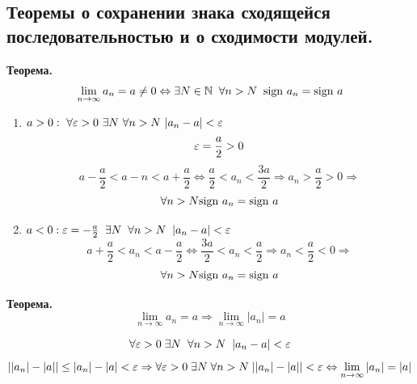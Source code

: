 \subsection{Теоремы о сохранении знака сходящейся последовательностью и о сходимости модулей.}

\begin{tcolorbox}
	\textbf{Теорема.}
	\[ \lim_{n\to\infty} a_n = a \not=0 \Leftrightarrow \exists N \in \mathbb{N}\;\; \forall n > N\;\; \text{sign\ } a_n = \text{sign\ } a \]
\end{tcolorbox}
\begin{tcolorbox}[title=Доказательство]
	\begin{enumerate}
		\item $a > 0:\ \forall \eps > 0\ \exists N\ \forall n > N\ |a_n - a|<\eps$
		\[ \varepsilon = \frac{a}{2} > 0 \]
		\[ a - \frac{a}{2} < a-n < a + \frac{a}{2} \Leftrightarrow \frac{a}{2} < a_n < \frac{3a}{2} \Rightarrow a_n > \frac{a}{2} > 0 \Rightarrow \]
		\[ \forall n > N \text{sign\ } a_n = \text{sign\ } a \]
	\item $a < 0: \varepsilon = -\frac{a}{2}\;\; \exists N \;\; \forall n > N\;\; |a_n - a| < \varepsilon$
		\[ a + \frac{a}{2} < a_n < a - \frac{a}{2} \Leftrightarrow \frac{3a}{2} < a_n < \frac{a}{2} \Rightarrow a_n < \frac{a}{2} < 0 \Rightarrow \]
		\[ \forall n > N \text{sign\ } a_n = \text{sign\ } a \]
	\end{enumerate}
\end{tcolorbox}

\begin{tcolorbox}
	\textbf{Теорема.}
	\[ \lim_{n\to\infty} a_n = a \Rightarrow \lim_{n\to\infty} |a_n| = a \]
\end{tcolorbox}

\begin{tcolorbox}[title=Доказательство]
	\[ \forall \varepsilon > 0\; \exists N\;\; \forall n > N\;\; | a_n - a| < \varepsilon \]	\[ ||a_n| - |a|| \leq |a_n| - |a| < \varepsilon \Rightarrow \forall \varepsilon > 0\; \exists N \; \forall n > N\; ||a_n| - |a|| < \varepsilon \Leftrightarrow \lim_{n\to\infty} |a_n| = |a| \]
\end{tcolorbox}

